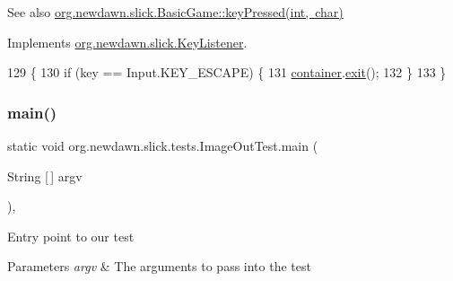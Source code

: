 \begin{DoxySeeAlso}{See also}
\mbox{\hyperlink{classorg_1_1newdawn_1_1slick_1_1_basic_game_a4fbb3345b5abf5ddd54a99466d07f02f}{org.\+newdawn.\+slick.\+Basic\+Game\+::key\+Pressed(int, char)}} 
\end{DoxySeeAlso}


Implements \mbox{\hyperlink{interfaceorg_1_1newdawn_1_1slick_1_1_key_listener_ac0b0568a21ef486c4f51382614c196ef}{org.\+newdawn.\+slick.\+Key\+Listener}}.


\begin{DoxyCode}
129                                             \{
130         \textcolor{keywordflow}{if} (key == Input.KEY\_ESCAPE) \{
131             \mbox{\hyperlink{classorg_1_1newdawn_1_1slick_1_1tests_1_1_image_out_test_a09db11b63df42087043028eceef5d69a}{container}}.\mbox{\hyperlink{classorg_1_1newdawn_1_1slick_1_1_game_container_a6d888463695fe3aac4123e72ac14480f}{exit}}();
132         \}
133     \}
\end{DoxyCode}
\mbox{\label{classorg_1_1newdawn_1_1slick_1_1tests_1_1_image_out_test_a9c7d863c46dcf109fdd07bcae4678fec}} 
\subsubsection{\texorpdfstring{main()}{main()}}
{\footnotesize\ttfamily static void org.\+newdawn.\+slick.\+tests.\+Image\+Out\+Test.\+main (\begin{DoxyParamCaption}\item[{String \mbox{[}$\,$\mbox{]}}]{argv }\end{DoxyParamCaption})\hspace{0.3cm}{\ttfamily [inline]}, {\ttfamily [static]}}

Entry point to our test


\begin{DoxyParams}{Parameters}
{\em argv} & The arguments to pass into the test \\
\hline
\end{DoxyParams}

